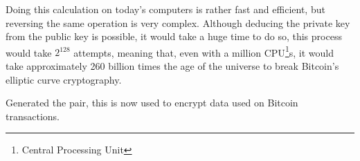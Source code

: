 \documentclass{article}
\begin{document}
Doing this calculation on today's computers is rather fast and efficient, but reversing the same operation is very complex. Although deducing the private key from the public key is possible, it would take a huge time to do so, this process would take \(2^{128}\) attempts, meaning that, even with a million CPU\footnote{Central Processing Unit}s, it would take approximately 260 billion times the age of the universe to break Bitcoin's elliptic curve cryptography.

Generated the pair, this is now used to encrypt data used on Bitcoin transactions.






\nocite{*}
\printbibliography
\end{document}
